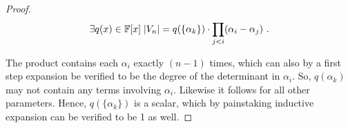 \begin{alphaparts}
\begin{proof}
        \begin{equation}
            \exists q(x) \in \mathbb{F}[x] \;|V_n| = q(\{\alpha_k\})\cdot\prod_{j < i} (\alpha_i - \alpha_j)~.
        \end{equation}

        The product contains each \(\alpha_i\) exactly \((n-1)\) times, which
        can also by a first step expansion be verified to be the degree of the
        determinant in \(\alpha_i\). So, \(q(\alpha_k)\) may not contain any
        terms involving \(\alpha_i\). Likewise it follows for all other
        parameters. Hence, \(q(\{\alpha_k\})\) is a scalar, which by painstaking
        inductive expansion can be verified to be 1 as well.
    \end{proof}
\end{alphaparts}